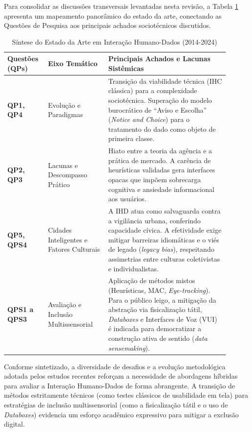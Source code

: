\documentclass[12pt]{article}
\begin{document}
{{    Para consolidar as discussões transversais levantadas nesta revisão, a Tabela \ref{tab:sintese_geral} apresenta um mapeamento panorâmico do estado da arte, conectando as Questões de Pesquisa aos principais achados sociotécnicos discutidos.

\vfill
\newpage

\begin{table}[H]
\centering
\caption{Síntese do Estado da Arte em Interação Humano-Dados (2014-2024)}
\label{tab:sintese_geral}
\small
\begin{tabular}{p{0.15\linewidth} p{0.25\linewidth} p{0.50\linewidth}}
\hline
\textbf{Questões (QPs)} & \textbf{Eixo Temático} & \textbf{Principais Achados e Lacunas Sistêmicas} \\ \hline
\textbf{QP1, QP4} & Evolução e Paradigmas & Transição da viabilidade técnica (IHC clássica) para a complexidade sociotécnica. Superação do modelo burocrático de ``Aviso e Escolha'' (\textit{Notice and Choice}) para o tratamento do dado como objeto de primeira classe. \\ \hline
\textbf{QP2, QP3} & Lacunas e Descompasso Prático & Hiato entre a teoria da agência e a prática de mercado. A carência de heurísticas validadas gera interfaces opacas que impõem sobrecarga cognitiva e ansiedade informacional aos usuários. \\ \hline
\textbf{QP5, QPS4} & Cidades Inteligentes e Fatores Culturais & A IHD atua como salvaguarda contra a vigilância urbana, conferindo capacidade cívica. A efetividade exige mitigar barreiras idiomáticas e o viés de legado (\textit{legacy bias}), respeitando assimetrias entre culturas coletivistas e individualistas. \\ \hline
\textbf{QPS1 a QPS3} & Avaliação e Inclusão Multissensorial & Aplicação de métodos mistos (Heurísticas, MAC, \textit{Eye-tracking}). Para o público leigo, a mitigação da abstração via fisicalização tátil, \textit{Databoxes} e Interfaces de Voz (VUI) é indicada para democratizar a construção ativa de sentido (\textit{data sensemaking}). \\ \hline
\end{tabular}
\end{table}

    Conforme sintetizado, a diversidade de desafios e a evolução metodológica adotada pelos estudos recentes reforçam a necessidade de abordagens híbridas para avaliar a Interação Humano-Dados de forma abrangente. A transição de métodos estritamente técnicos (como testes clássicos de usabilidade em tela) para estratégias de inclusão multissensorial (como a fisicalização tátil e o uso de \textit{Databoxes}) evidencia um esforço acadêmico expressivo para mitigar a exclusão digital. 

}}
\end{document}
